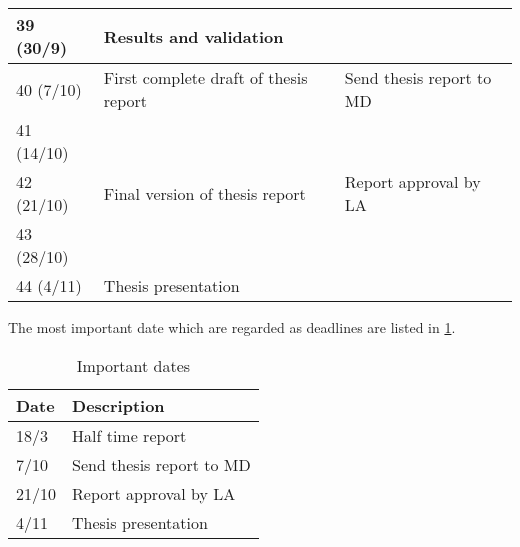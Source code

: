 \begin{table}[H]
\begin{tabular}{|p{}|p{}|p{}|}
	39 (30/9)            & Results and validation                &  \\ \hline
	40 (7/10)            & First complete draft of thesis report & Send thesis report to MD\\ \hline
	41 (14/10)           &                                       &  \\ \hline
	42 (21/10)           & Final version of thesis report        & Report approval by LA
	  \\ \hline
	43 (28/10)           &                                       &  \\ \hline
	44 (4/11)            & Thesis presentation                   &  \\ \hline
\end{tabular}
\end{table}

The most important date which are regarded as deadlines are listed in \cref{table:dates}.


\begin{table}[H]
	\centering
	\caption{Important dates}
	\label{table:dates}
	\begin{tabular}{|p{}|p{}|}
		\hline
		\textbf{Date} & \textbf{Description}                  \\ \hline
		18/3          & Half time report                      \\ \hline
		7/10          & Send thesis report to MD     \\ \hline
		21/10         & Report approval by LA \\ \hline
		4/11          & Thesis presentation                   \\ \hline
	\end{tabular}
\end{table}
